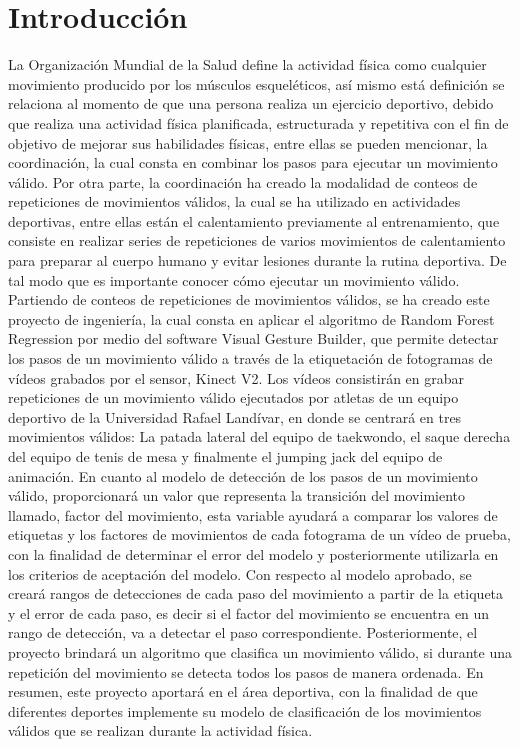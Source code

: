 \afterpage{\blankpage}
\newpage
\chapter{Introducci\'on}
La Organizaci\'on Mundial de la Salud define la actividad f\'isica como cualquier movimiento producido por los m\'usculos esquel\'eticos, as\'i mismo est\'a definici\'on se relaciona al momento de que una persona realiza un ejercicio deportivo, debido que realiza una actividad f\'isica planificada, estructurada y repetitiva con el fin de objetivo de mejorar sus habilidades f\'isicas, entre ellas se pueden mencionar, la coordinaci\'on, la cual consta en combinar los pasos para ejecutar un movimiento v\'alido.
\medbreak
Por otra parte, la coordinaci\'on ha creado la modalidad de conteos de repeticiones de movimientos   v\'alidos, la cual se ha utilizado en actividades  deportivas, entre ellas est\'an el calentamiento previamente al entrenamiento, que consiste en realizar series de repeticiones de varios movimientos de calentamiento para preparar al cuerpo humano y evitar lesiones durante la rutina deportiva. De tal modo que es importante conocer c\'omo ejecutar un movimiento v\'alido.
\medbreak
Partiendo de conteos de repeticiones de movimientos v\'alidos, se ha creado este proyecto de ingenier\'ia, la cual consta en aplicar el algoritmo de Random Forest Regression por medio del software Visual Gesture Builder, que permite detectar los pasos de un movimiento v\'alido a trav\'es de la etiquetaci\'on de fotogramas de v\'ideos grabados por el sensor, Kinect V2.
\medbreak
Los v\'ideos consistir\'an en grabar repeticiones de un movimiento v\'alido ejecutados por atletas de un equipo deportivo de la Universidad Rafael Land\'ivar, en donde se centrar\'a en tres movimientos v\'alidos: La patada lateral del equipo de taekwondo, el saque derecha del equipo de tenis de mesa y finalmente el jumping jack del equipo de animaci\'on.
\medbreak
En cuanto al modelo de detecci\'on de los pasos de un movimiento v\'alido, proporcionar\'a un valor que representa la transici\'on del movimiento llamado, factor del movimiento, esta variable ayudar\'a a comparar los valores de etiquetas y los  factores de movimientos de cada fotograma de un v\'ideo de prueba, con la finalidad de determinar el error del modelo y posteriormente utilizarla en los criterios de aceptaci\'on del modelo.
\medbreak
Con respecto al modelo aprobado, se crear\'a rangos de detecciones de cada paso del movimiento a partir de la etiqueta y el error de cada paso, es decir si el factor del movimiento se encuentra en un rango de detecci\'on, va a detectar el paso correspondiente. Posteriormente, el proyecto brindar\'a un algoritmo que clasifica un movimiento v\'alido, si durante una repetici\'on del movimiento se detecta todos los pasos de manera ordenada.
\medbreak
En resumen, este proyecto aportar\'a en el \'area deportiva, con la finalidad de que diferentes deportes implemente su modelo de clasificaci\'on de los movimientos v\'alidos que se realizan durante la actividad f\'isica.

